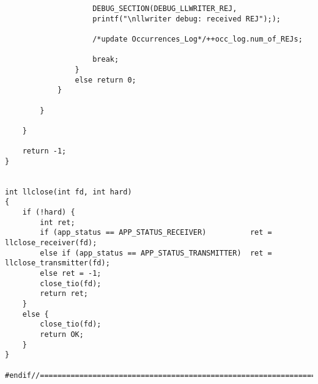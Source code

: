 \begin{lstlisting}
					DEBUG_SECTION(DEBUG_LLWRITER_REJ,
				    printf("\nllwriter debug: received REJ"););
					
					/*update Occurrences_Log*/++occ_log.num_of_REJs;

					break;
				}
				else return 0;
			}

		}

	}

	return -1;
}


int llclose(int fd, int hard)
{
	if (!hard) {
		int ret;
		if (app_status == APP_STATUS_RECEIVER)			ret = llclose_receiver(fd);
		else if (app_status == APP_STATUS_TRANSMITTER)  ret = llclose_transmitter(fd);
		else ret = -1;
		close_tio(fd);
		return ret;
	}
	else {
		close_tio(fd);
		return OK;
	}
}

#endif//==========================================================================

\end{lstlisting}
